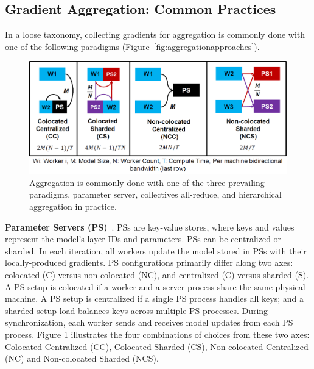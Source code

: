 \subsection{Gradient Aggregation: Common Practices}
In a loose taxonomy, collecting gradients for aggregation is commonly done with one of the following paradigms (Figure~\ref{fig:aggregationapproaches}).


\begin{figure}[t!]
	\centering
	\includegraphics[width=.7\linewidth, trim=2 3 3 3,clip]{Figures/pssetups.PNG}
	\caption{Aggregation is commonly done with one of the three prevailing paradigms, parameter server, collectives all-reduce, and hierarchical aggregation in practice.}
	\label{fig:pssetups}
\end{figure}

\noindent\textbf{Parameter Servers (PS)}~\cite{ps0,ps1,ps2,ps3, phubsocc, phubsysml, poseidon,cui2016geeps}. %
PSs are key-value stores, where keys and values represent the model's layer IDs and parameters. PSs can be centralized or sharded. In each iteration, all workers update the model stored in PSs with their locally-produced gradients. PS configurations primarily differ along two axes: colocated (C) versus non-colocated (NC), and centralized (C) versus sharded (S). %
A PS setup is colocated if a worker and a server process share the same physical machine. A PS setup is centralized if a single PS process handles all keys; and a sharded setup load-balances keys across multiple PS processes.
During synchronization, each worker sends and receives model updates from each PS process. Figure \ref{fig:pssetups} illustrates the four combinations of choices from these two axes: Colocated Centralized (CC), Colocated Sharded (CS), Non-colocated Centralized (NC) and Non-colocated Sharded (NCS).

